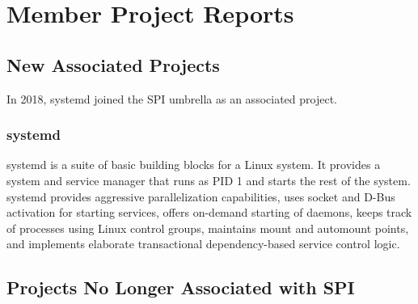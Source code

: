 \documentclass[a4paper]{report}
\begin{document}
\chapter{Member Project Reports}

\section{New Associated Projects}

In 2018, systemd joined the SPI umbrella as an associated project.

\subsection{systemd}

systemd is a suite of basic building blocks for a Linux system. It
provides a system and service manager that runs as PID 1 and starts the
rest of the system. systemd provides aggressive parallelization
capabilities, uses socket and D-Bus activation for starting services,
offers on-demand starting of daemons, keeps track of processes using
Linux control groups, maintains mount and automount points, and
implements elaborate transactional dependency-based service control logic.

\section{Projects No Longer Associated with SPI}
\end{document}
